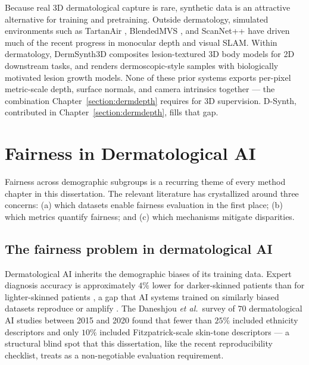 \documentclass[11pt]{ucthesis}
\newcommand{\etal}{\textit{et al.}\xspace}
\begin{document}
Because real 3D dermatological capture is rare, synthetic data is an attractive alternative for training and pretraining. Outside dermatology, simulated environments such as TartanAir \cite{tartanair2020iros}, BlendedMVS \cite{yao2020blendedmvs}, and ScanNet++ \cite{yeshwanthliu2023scannetpp} have driven much of the recent progress in monocular depth and visual SLAM. Within dermatology, DermSynth3D \cite{sinha2024dermsynth3d} composites lesion-textured 3D body models for 2D downstream tasks, and \cite{kim-2024} renders dermoscopic-style samples with biologically motivated lesion growth models. None of these prior systems exports per-pixel metric-scale depth, surface normals, and camera intrinsics together --- the combination Chapter~\ref{section:dermdepth} requires for 3D supervision. D-Synth, contributed in Chapter~\ref{section:dermdepth}, fills that gap.

\section{Fairness in Dermatological AI}
\label{sec:bg_fair}

Fairness across demographic subgroups is a recurring theme of every method chapter in this dissertation. The relevant literature has crystallized around three concerns: (a) which datasets enable fairness evaluation in the first place; (b) which metrics quantify fairness; and (c) which mechanisms mitigate disparities.

\subsection{The fairness problem in dermatological AI}

Dermatological AI inherits the demographic biases of its training data. Expert diagnosis accuracy is approximately $4\%$ lower for darker-skinned patients than for lighter-skinned patients \cite{groh-2024}, a gap that AI systems trained on similarly biased datasets reproduce or amplify \cite{daneshjou_2022_disparities,owens_2020_those,chen_2021_ethical,kleinberg-2022,obermeyer_2019_dissecting}. The Daneshjou \etal\ survey \cite{daneshjou_2021_lack} of $70$ dermatological AI studies between 2015 and 2020 found that fewer than $25\%$ included ethnicity descriptors and only $10\%$ included Fitzpatrick-scale \cite{fitzpatrick_1988_the} skin-tone descriptors --- a structural blind spot that this dissertation, like the recent \cite{daneshjou_2022_checklist} reproducibility checklist, treats as a non-negotiable evaluation requirement.
\end{document}
